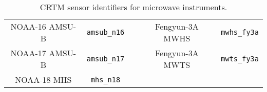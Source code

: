 \begin{table}[htp]
\begin{tabular}{c c c c c}
NOAA-16 AMSU-B  & \texttt{amsub\_n16}     & \hspace{0.2cm} & Fengyun-3A MWHS  & \texttt{mwhs\_fy3a}         \\
NOAA-17 AMSU-B  & \texttt{amsub\_n17}     & \hspace{0.2cm} & Fengyun-3A MWTS  & \texttt{mwts\_fy3a}         \\
NOAA-18 MHS     & \texttt{mhs\_n18}       & \hspace{0.2cm} & & \\
    \hline
  \end{tabular}
  \caption{CRTM sensor identifiers for microwave instruments.}
  \label{tab:mw_sensor_id}
\end{table}


